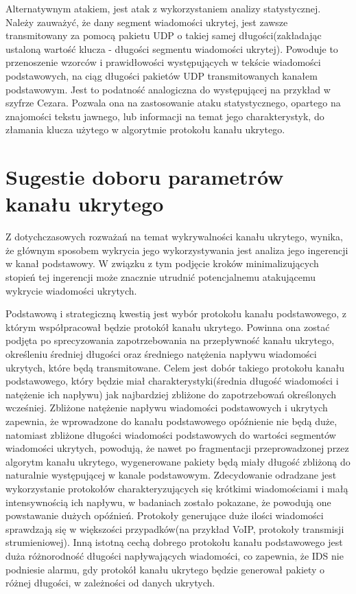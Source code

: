 \documentclass[a4paper, twoside, 12pt]{report}
\begin{document}
       Alternatywnym atakiem, jest atak z wykorzystaniem analizy statystycznej.
       Należy zauważyć, że dany segment wiadomości ukrytej, jest zawsze transmitowany
       za pomocą pakietu UDP o takiej samej długości(zakładając ustaloną wartość klucza -
       długości segmentu wiadomości ukrytej). Powoduje to przenoszenie wzorców i
       prawidłowości występujących w tekście wiadomości podstawowych, na ciąg długości
       pakietów UDP transmitowanych kanałem podstawowym. Jest to podatność analogiczna
       do występującej na przykład w szyfrze Cezara. Pozwala ona na zastosowanie
       ataku statystycznego, opartego na znajomości tekstu jawnego, lub informacji
       na temat jego charakterystyk, do złamania klucza użytego w algorytmie protokołu
       kanału ukrytego.

    \section{Sugestie doboru parametrów kanału ukrytego} \label{SUGESTIEPARAMETROW}
       Z dotychczasowych rozważań na temat wykrywalności kanału ukrytego, wynika,
       że głównym sposobem wykrycia jego wykorzystywania jest analiza jego ingerencji
       w kanał podstawowy. W związku z tym podjęcie kroków minimalizujących stopień
       tej ingerencji może znacznie utrudnić potencjalnemu atakującemu wykrycie
       wiadomości ukrytych.

       Podstawową i strategiczną kwestią jest wybór protokołu kanału podstawowego,
       z którym współpracował będzie protokół kanału ukrytego. Powinna ona zostać
       podjęta po sprecyzowania zapotrzebowania na przepływność kanału ukrytego,
       określeniu średniej długości oraz średniego natężenia napływu wiadomości
       ukrytych, które będą transmitowane. Celem jest dobór takiego protokołu
       kanału podstawowego, który będzie miał charakterystyki(średnia długość wiadomości
       i natężenie ich napływu) jak najbardziej zbliżone do zapotrzebowań określonych
       wcześniej. Zbliżone natężenie napływu wiadomości podstawowych i ukrytych zapewnia,
       że wprowadzone do kanału podstawowego opóźnienie nie będą duże, natomiast
       zbliżone długości wiadomości podstawowych do wartości segmentów wiadomości ukrytych,
       powodują, że nawet po fragmentacji przeprowadzonej przez algorytm kanału ukrytego,
       wygenerowane pakiety będą miały długość zbliżoną do naturalnie występującej
       w kanale podstawowym. Zdecydowanie odradzane jest wykorzystanie protokołów
       charakteryzujących się krótkimi wiadomościami i małą intensywnością ich napływu,
       w badaniach zostało pokazane, że powodują one powstawanie dużych opóźnień.
       Protokoły generujące duże ilości wiadomości sprawdzają się w większości
       przypadków(na przykład VoIP, protokoły transmisji strumieniowej).
       Inną istotną cechą dobrego protokołu kanału podstawowego jest duża różnorodność
       długości napływających wiadomości, co zapewnia, że IDS nie podniesie alarmu,
       gdy protokół kanału ukrytego będzie generował pakiety o różnej długości,
       w zależności od danych ukrytych.
\end{document}
